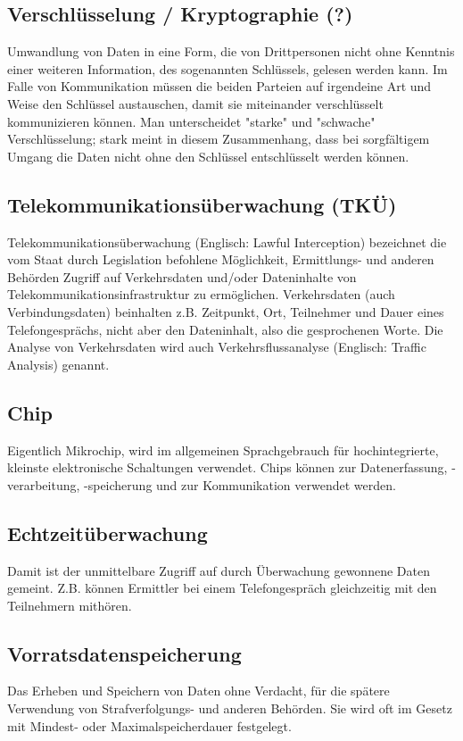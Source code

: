 \subsection{
Verschl\"usselung / Kryptographie (?) 
}
Umwandlung von Daten in eine Form, die von Drittpersonen nicht ohne 
Kenntnis einer weiteren Information, des sogenannten Schl\"ussels, 
gelesen werden kann. Im Falle von Kommunikation m\"ussen die beiden 
Parteien auf irgendeine Art und Weise den Schl\"ussel austauschen, damit 
sie miteinander verschl\"usselt kommunizieren k\"onnen. Man 
unterscheidet "starke" und "schwache" Verschl\"usselung; stark meint in 
diesem Zusammenhang, dass bei sorgf\"altigem Umgang die Daten nicht ohne 
den Schl\"ussel entschl\"usselt werden k\"onnen. 

\subsection{
Telekommunikations\"uberwachung (TK\"U) 
}
Telekommunikations\"uberwachung (Englisch: Lawful Interception) 
bezeichnet die vom Staat durch Legislation befohlene M\"oglichkeit, 
Ermittlungs- und anderen Beh\"orden Zugriff auf Verkehrsdaten und/oder 
Dateninhalte von Telekommunikationsinfrastruktur zu erm\"oglichen. 
Verkehrsdaten (auch Verbindungsdaten) beinhalten z.B. Zeitpunkt, Ort, 
Teilnehmer und Dauer eines Telefongespr\"achs, nicht aber den 
Dateninhalt, also die gesprochenen Worte. Die Analyse von Verkehrsdaten 
wird auch Verkehrsflussanalyse (Englisch: Traffic Analysis) genannt. 

\subsection{
Chip 
}
Eigentlich Mikrochip, wird im allgemeinen Sprachgebrauch f\"ur 
hochintegrierte, kleinste elektronische Schaltungen verwendet. Chips 
k\"onnen zur Datenerfassung, -verarbeitung, -speicherung und zur 
Kommunikation verwendet werden. 

\subsection{
Echtzeit\"uberwachung 
}
Damit ist der unmittelbare Zugriff auf durch \"Uberwachung gewonnene 
Daten gemeint. Z.B. k\"onnen Ermittler bei einem Telefongespr\"ach 
gleichzeitig mit den Teilnehmern mith\"oren. 

\subsection{
Vorratsdatenspeicherung 
}
Das Erheben und Speichern von Daten ohne Verdacht, f\"ur die sp\"atere 
Verwendung von Strafverfolgungs- und anderen Beh\"orden. Sie wird oft im 
Gesetz mit Mindest- oder Maximalspeicherdauer festgelegt. 

